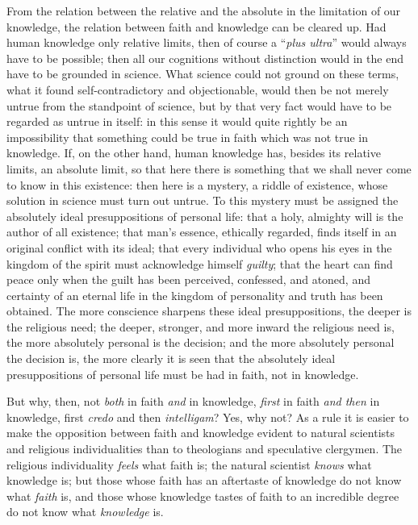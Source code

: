 \documentclass[12pt]{book}
\newcommand{\opage}[1]{\marginnote{\footnotesize\textit{[#1]}}}
\begin{document}
From the relation between the relative and the absolute in the limitation of our knowledge, the relation between faith and knowledge can be cleared up. Had human knowledge only relative limits, then of course a ``\textit{plus ultra}'' would always have to be possible; then all our cognitions without distinction would in the end have to be grounded in science. What science could not ground on these terms, what it found self-contradictory and objectionable, would then be not merely untrue from the standpoint of science, but by that very fact would have to be regarded as untrue in itself: in this sense it would quite rightly be an impossibility that something could be true in faith which was not true in knowledge. If, on the other hand, human knowledge has, besides its relative limits, an absolute limit, so that here there is something that we shall never come to know in this existence: then here is a mystery, a riddle of existence, whose solution in science must turn out untrue. To this mystery must be assigned the absolutely ideal presuppositions of personal life: that a holy, almighty will is the author of all existence; that man's essence, ethically regarded,
\opage{29}\setcounter{footnote}{0}%
finds itself in an original conflict with its ideal; that every individual who opens his eyes in the kingdom of the spirit must acknowledge himself \emph{guilty}; that the heart can find peace only when the guilt has been perceived, confessed, and atoned, and certainty of an eternal life in the kingdom of personality and truth has been obtained. The more conscience sharpens these ideal presuppositions, the deeper is the religious need; the deeper, stronger, and more inward the religious need is, the more absolutely personal is the decision; and the more absolutely personal the decision is, the more clearly it is seen that the absolutely ideal presuppositions of personal life must be had in faith, not in knowledge.

But why, then, not \emph{both} in faith \emph{and} in knowledge, \emph{first} in faith \emph{and then} in knowledge, first \textit{credo} and then \textit{intelligam}? Yes, why not? As a rule it is easier to make the opposition between faith and knowledge evident to natural scientists and religious individualities than to theologians and speculative clergymen. The religious individuality \emph{feels} what faith is; the natural scientist \emph{knows} what knowledge is; but those whose faith has an aftertaste of knowledge do not know what \emph{faith} is, and those whose knowledge tastes of faith to an incredible degree do not know what \emph{knowledge} is.
\end{document}
